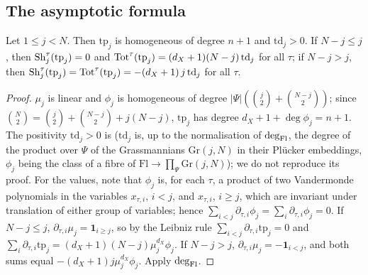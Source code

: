 \subsection{The asymptotic formula}\label{pf:volthm:sec:asym}

\begin{lemma}\label{pf:volthm:lem:testpoly}
Let $1\le j<N$. Then $\mathrm{tp}_j$ is homogeneous of degree $n+1$ and $\mathrm{td}_j>0$. If $N-j\le j$, then
$\mathrm{Sh}_j^\tau(\mathrm{tp}_j)=0$ and $\mathrm{Tot}^\tau(\mathrm{tp}_j)=(d_X+1)(N-j)\,\mathrm{td}_j$ for all $\tau$; if
$N-j>j$, then $\mathrm{Sh}_j^\tau(\mathrm{tp}_j)=\mathrm{Tot}^\tau(\mathrm{tp}_j)=-(d_X+1)\,j\,\mathrm{td}_j$ for all $\tau$.
\end{lemma}

\begin{proof}
$\mu_j$ is linear and $\phi_j$ is homogeneous of degree $|\Psi|(\binom j2+\binom{N-j}2)$; since
$\binom N2=\binom j2+\binom{N-j}2+j(N-j)$, $\mathrm{tp}_j$ has degree $d_X+1+\deg\phi_j=n+1$. The positivity
$\mathrm{td}_j>0$ is  ($\mathrm{td}_j$ is, up to the normalisation of
$\deg_{\mathrm{Fl}}$, the degree of the product over $\Psi$ of the Grassmannians $\mathrm{Gr}(j,N)$ in their Pl\"ucker
embeddings, $\phi_j$ being the class of a fibre of $\mathrm{Fl}\to\prod_\Psi\mathrm{Gr}(j,N)$); we do not
reproduce its proof. For the values, note that $\phi_j$ is, for each $\tau$, a product of two Vandermonde
polynomials in the variables $x_{\tau,i}$, $i<j$, and $x_{\tau,i}$, $i\ge j$, which are invariant under
translation of either group of variables; hence $\sum_{i<j}\partial_{\tau,i}\phi_j=\sum_i\partial_{\tau,i}\phi_j=0$.
If $N-j\le j$, $\partial_{\tau,i}\mu_j=\mathbf 1_{i\ge j}$, so by the Leibniz rule
$\sum_{i<j}\partial_{\tau,i}\mathrm{tp}_j=0$ and $\sum_i\partial_{\tau,i}\mathrm{tp}_j=(d_X+1)(N-j)\mu_j^{d_X}\phi_j$.
If $N-j>j$, $\partial_{\tau,i}\mu_j=-\mathbf 1_{i<j}$, and both sums equal $-(d_X+1)j\mu_j^{d_X}\phi_j$. Apply
$\deg_{\mathrm{Fl}}$.
\end{proof}

